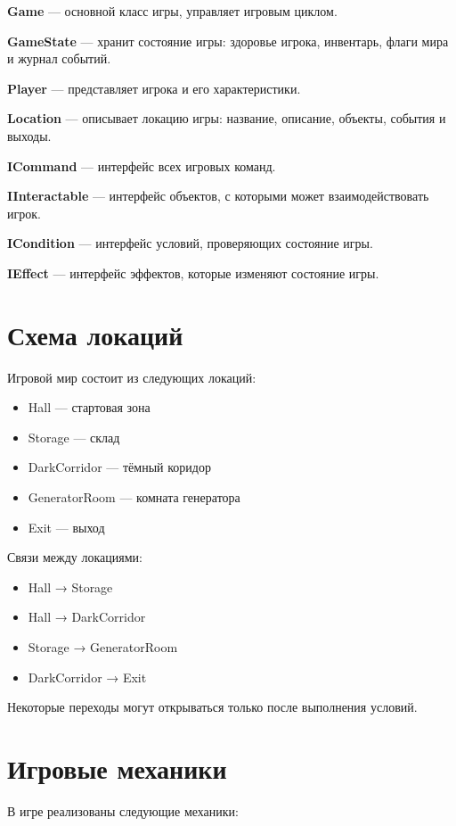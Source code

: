\documentclass[a4paper,12pt]{article}
\begin{document}
\textbf{Game} — основной класс игры, управляет игровым циклом.

\textbf{GameState} — хранит состояние игры: здоровье игрока, инвентарь, флаги мира и журнал событий.

\textbf{Player} — представляет игрока и его характеристики.

\textbf{Location} — описывает локацию игры: название, описание, объекты, события и выходы.

\textbf{ICommand} — интерфейс всех игровых команд.

\textbf{IInteractable} — интерфейс объектов, с которыми может взаимодействовать игрок.

\textbf{ICondition} — интерфейс условий, проверяющих состояние игры.

\textbf{IEffect} — интерфейс эффектов, которые изменяют состояние игры.

\section{Схема локаций}

Игровой мир состоит из следующих локаций:

\begin{itemize}
\item Hall — стартовая зона
\item Storage — склад
\item DarkCorridor — тёмный коридор
\item GeneratorRoom — комната генератора
\item Exit — выход
\end{itemize}

Связи между локациями:

\begin{itemize}
\item Hall → Storage
\item Hall → DarkCorridor
\item Storage → GeneratorRoom
\item DarkCorridor → Exit
\end{itemize}

Некоторые переходы могут открываться только после выполнения условий.

\section{Игровые механики}

В игре реализованы следующие механики:
\end{document}
